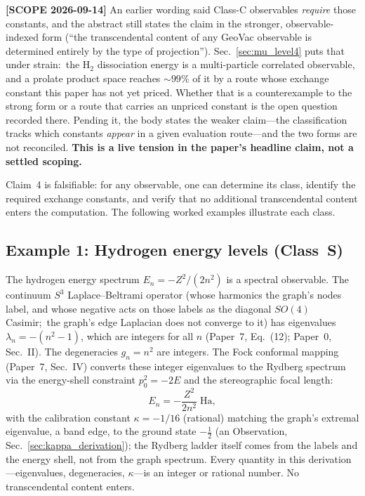 \documentclass[aps,pra,twocolumn,superscriptaddress,longbibliography]{revtex4-2}
\begin{document}
\medskip

\noindent\textbf{[SCOPE 2026-09-14]} An earlier wording said Class-C
observables \emph{require} those constants, and the abstract still states
the claim in the stronger, observable-indexed form (``the transcendental
content of any GeoVac observable is determined entirely by the type of
projection'').  Sec.~\ref{sec:mu_level4} puts that under strain:\ the
H$_2$ dissociation energy is a multi-particle correlated observable, and a
prolate product space reaches ${\sim}99\%$ of it by a route whose exchange
constant this paper has not yet priced.  Whether that is a counterexample
to the strong form or a route that carries an unpriced constant is the open
question recorded there.  Pending it, the body states the weaker claim---the
classification tracks which constants \emph{appear} in a given evaluation
route---and the two forms are not reconciled.  \textbf{This is a live
tension in the paper's headline claim, not a settled scoping.}

\medskip

Claim~4 is falsifiable: for any observable, one can determine
its class, identify the required exchange constants, and verify
that no additional transcendental content enters the computation.
The following worked examples illustrate each class.

\subsection{Example 1: Hydrogen energy levels (Class~S)}

The hydrogen energy spectrum $E_n = -Z^2/(2n^2)$ is a spectral
observable.  The continuum $S^3$ Laplace--Beltrami operator (whose
harmonics the graph's nodes label, and whose negative acts on those
labels as the diagonal $SO(4)$ Casimir;\ the graph's edge Laplacian
does not converge to it) has eigenvalues
$\lambda_n = -(n^2 - 1)$, which are integers for all $n$
(Paper~7, Eq.~(12); Paper~0, Sec.~II).  The degeneracies
$g_n = n^2$ are integers.  The Fock conformal mapping (Paper~7,
Sec.~IV) converts these integer eigenvalues to the Rydberg
spectrum via the energy-shell constraint $p_0^2 = -2E$
and the stereographic focal length:
\begin{equation}
  E_n = -\frac{Z^2}{2n^2}\;\text{Ha},
  \label{eq:hydrogen_class_s}
\end{equation}
with the calibration constant $\kappa = -1/16$ (rational)
matching the graph's extremal eigenvalue, a band edge, to the ground
state $-\tfrac12$ (an Observation, Sec.~\ref{sec:kappa_derivation});
the Rydberg ladder itself comes from the labels and the energy shell,
not from the graph spectrum.  Every quantity in this
derivation---eigenvalues, degeneracies, $\kappa$---is an
integer or rational number.  No transcendental content enters.
\end{document}
